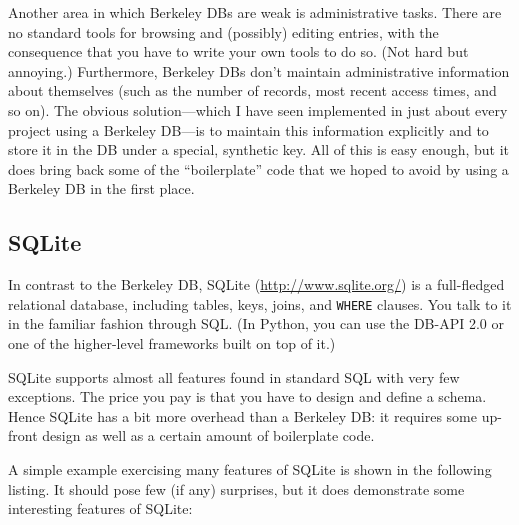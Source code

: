 Another area in which Berkeley DBs are weak is administrative tasks.
There are no standard tools for browsing and (possibly) editing
entries, with the consequence that you have to write your own tools to
do so. (Not hard but annoying.) Furthermore, Berkeley DBs don't
maintain administrative information about themselves (such as the
number of records, most recent access times, and so on). The obvious
solution---which I have seen implemented in just about every
project\vadjust{\vfill\pagebreak} using a Berkeley DB---is to maintain this information
explicitly and to store it in the DB under a special, synthetic key. All of this is
easy enough, but it does bring back some of the ``boilerplate'' code
that we hoped to avoid by using a Berkeley DB in the first place.

\subsection{SQLite}


In contrast to the Berkeley DB, SQLite (\url{http://www.sqlite.org/})
is a full-fledged relational
database, including tables, keys, joins, and \texttt{WHERE} clauses.
You talk to it in the familiar fashion through SQL.  (In Python, you
can use the DB-API 2.0 or one of the higher-level frameworks built on
top of it.)

SQLite supports almost all features found in standard SQL with very
few exceptions.  The price you pay is that you have to design and
define a schema. Hence SQLite has a bit more overhead than a Berkeley
DB: it requires some up-front design as well as a certain amount of
boilerplate code.

A simple example exercising many features of SQLite is shown in the
following listing.  It should pose few (if any) surprises, but it does
demonstrate some interesting features of SQLite:

